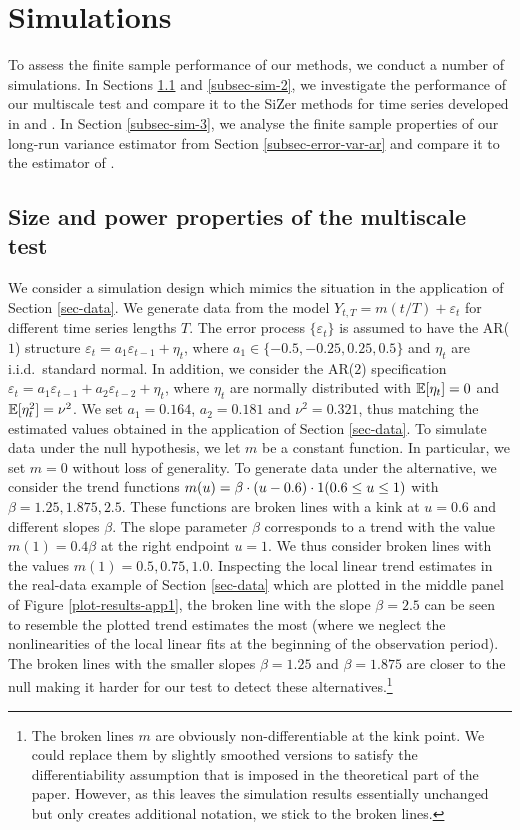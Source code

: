 
\section{Simulations}\label{sec-sim}


To assess the finite sample performance of our methods, we conduct a number of simulations. In Sections \ref{subsec-sim-1} and \ref{subsec-sim-2}, we investigate the performance of our multiscale test and compare it to the SiZer methods for time series developed in \cite{Rondonotti2004} and \cite{Rondonotti2007}. In Section \ref{subsec-sim-3}, we analyse the finite sample properties of our long-run variance estimator from Section \ref{subsec-error-var-ar} and compare it to the estimator of \cite{Hall2003}. 


\subsection{Size and power properties of the multiscale test}\label{subsec-sim-1} 


We consider a simulation design which mimics the situation in the application of Section \ref{sec-data}. We generate data from the model $Y_{t,T} = m(t/T) + \varepsilon_t$ for different time series lengths $T$. The error process $\{ \varepsilon_t\}$ is assumed to have the AR($1$) structure $\varepsilon_t = a_1 \varepsilon_{t-1} + \eta_t$, where $a_1 \in \{-0.5,-0.25,0.25,0.5\}$ and $\eta_t$ are i.i.d.\ standard normal. In addition, we consider the AR($2$) specification $\varepsilon_t = a_1 \varepsilon_{t-1} + a_2 \varepsilon_{t-2} + \eta_t$, where $\eta_t$ are normally distributed with $\mathbb{E}[\eta_t] = 0$ and $\mathbb{E}[\eta_t^2] = \nu^2$. We set $a_1 = 0.164$, $a_2 = 0.181$ and $\nu^2 = 0.321$, thus matching the estimated values obtained in the application of Section \ref{sec-data}. To simulate data under the null hypothesis, we let $m$ be a constant function. In particular, we set $m = 0$ without loss of generality. To generate data under the alternative, we consider the trend functions $m(u) = \beta \cdot (u - 0.6) \cdot 1(0.6 \le u \le 1)$ with $\beta = 1.25, 1.875, 2.5$. These functions are broken lines with a kink at $u = 0.6$ and different slopes $\beta$. The slope parameter $\beta$ corresponds to a trend with the value $m(1) = 0.4 \beta$ at the right endpoint $u = 1$. We thus consider broken lines with the values $m(1) = 0.5, 0.75, 1.0$. Inspecting the local linear trend estimates in the real-data example of Section \ref{sec-data} which are plotted in the middle panel of  Figure \ref{plot-results-app1}, the broken line with the slope $\beta = 2.5$ can be seen to resemble the plotted trend estimates the most (where we neglect the nonlinearities of the local linear fits at the beginning of the observation period). The broken lines with the smaller slopes $\beta = 1.25$ and $\beta = 1.875$ are closer to the null making it harder for our test to detect these alternatives.\footnote{The broken lines $m$ are obviously non-differentiable at the kink point. We could replace them by slightly smoothed versions to satisfy the differentiability assumption that is imposed in the theoretical part of the paper. However, as this leaves the simulation results essentially unchanged but only creates additional notation, we stick to the broken lines.}


